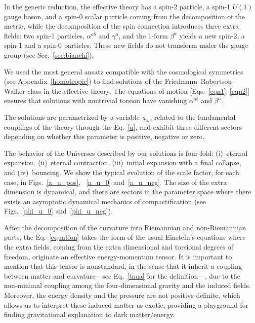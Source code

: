 \documentclass[aps,prd,12pt,superscriptaddress,showpacs,showkeys,longbibliography,reprint,nofootinbib]{revtex4-1}
\begin{document}
In the generic reduction, the effective theory has a spin-2 particle, a spin-1 $U(1)$ gauge boson, and a spin-0 scalar particle coming from the decomposition of the metric, while the decomposition of the spin connection introduces three extra fields: two spin-1 particles, $\alpha^{ab}$ and $\gamma^a$, and the 1-form $\beta^a$ yields a new spin-2, a spin-1 and a spin-0 particles. These new fields do not transform under the gauge group (see Sec.~\ref{sec:bianchi}).

We used the most general ansatz compatible with the cosmological symmetries (see Appendix~\ref{homotropic}) to find solutions of the Friedmann--Robertson--Walker class in the effective theory. The equations of motion [Eqs.~\eqref{eqn1}--\eqref{eqn2}] ensures that solutions with nontrivial torsion have vanishing $\alpha^{ab}$ and $\beta^a$.

The solutions are parametrized by a variable $u_\pm$, related to the fundamental couplings of the theory through the Eq.~\eqref{u}, and exhibit three different sectors depending on whether this parameter is positive, negative or zero.

The behavior of the Universes described by our solutions is four-fold: (i)~eternal expansion, (ii)~eternal contraction, (iii)~initial expansion with a final collapse, and (iv)~bouncing. We show the typical evolution of the scale factor, for each case, in Figs.~\ref{a_u_pos}, ~\ref{a_u_0} and~\ref{a_u_neg}. The size of the extra dimension is dynamical, and there are sectors in the parameter space where there exists an asymptotic dynamical mechanics of compactification (see Figs.~\ref{phi_u_0} and~\ref{phi_u_neg}). 

After the decomposition of the curvature into Riemannian and non-Riemannian parts, the Eq.~\eqref{equation} takes the form of the usual Einstein's equations where the extra fields, coming from the extra dimensional and torsional degrees of freedom, originate an effective energy-momentum tensor. It is important to mention that this tensor is nonstandard, in the sense that it inherit a coupling between matter and curvature---see Eq.~\eqref{taua} for the definition---, due to the non-minimal coupling among the four-dimensional gravity and the induced fields. Moreover, the energy density and the pressure are not positive definite, which allows us to interpret these induced matter as exotic, providing a playground for finding gravitational explanation to dark matter/energy.

\end{document}
